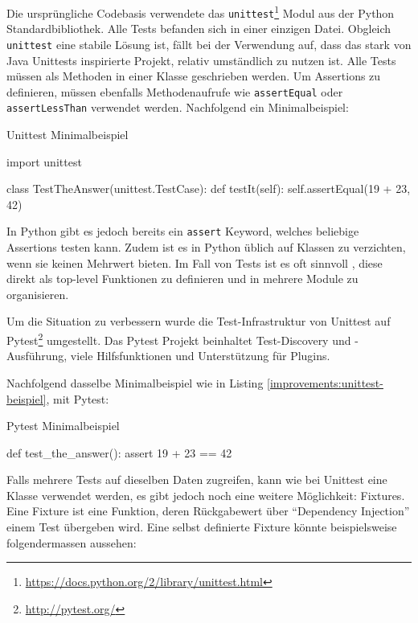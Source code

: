 Die ursprüngliche Codebasis verwendete das
\texttt{unittest}\footnote{\url{https://docs.python.org/2/library/unittest.html}}
Modul aus der Python Standardbibliothek. Alle Tests befanden sich in einer
einzigen Datei.  Obgleich \texttt{unittest} eine stabile Lösung ist, fällt bei
der Verwendung auf, dass das stark von Java Unittests inspirierte Projekt,
relativ umständlich zu nutzen ist. Alle Tests müssen als Methoden in einer
Klasse geschrieben werden. Um Assertions zu definieren, müssen ebenfalls
Methodenaufrufe wie \texttt{assertEqual} oder \texttt{assertLessThan} verwendet
werden. Nachfolgend ein Minimalbeispiel:

\begin{listing}
\caption{Unittest Minimalbeispiel}
\label{improvements:unittest-beispiel}
\begin{pythoncode}
import unittest

class TestTheAnswer(unittest.TestCase):
    def testIt(self):
        self.assertEqual(19 + 23, 42)
\end{pythoncode}
\end{listing}

In Python gibt es jedoch bereits ein \texttt{assert} Keyword, welches beliebige
Assertions testen kann. Zudem ist es in Python üblich auf Klassen zu
verzichten, wenn sie keinen Mehrwert bieten. Im Fall von Tests ist es oft
sinnvoll , diese direkt als top-level Funktionen zu definieren und in mehrere
Module zu organisieren.

Um die Situation zu verbessern wurde die Test-Infrastruktur von
Unittest auf Pytest\footnote{\url{http://pytest.org/}} umgestellt. Das
Pytest Projekt beinhaltet Test-Discovery und -Ausführung, viele Hilfsfunktionen
und Unterstützung für Plugins.

Nachfolgend dasselbe Minimalbeispiel wie in Listing
\ref{improvements:unittest-beispiel}, mit Pytest:

\begin{listing}
\caption{Pytest Minimalbeispiel}
\label{improvements:pytest-beispiel}
\begin{pythoncode}
def test_the_answer():
    assert 19 + 23 == 42
\end{pythoncode}
\end{listing}

Falls mehrere Tests auf dieselben Daten zugreifen, kann wie bei Unittest eine
Klasse verwendet werden, es gibt jedoch noch eine weitere Möglichkeit: Fixtures.
Eine Fixture ist eine Funktion, deren Rückgabewert über \enquote{Dependency
Injection} einem Test übergeben wird. Eine selbst definierte Fixture könnte
beispielsweise folgendermassen aussehen:

